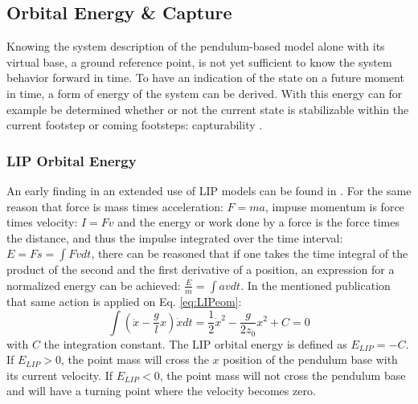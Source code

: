 \subsection{Orbital Energy \& Capture}\label{sec:ewalking}
Knowing the system description of the pendulum-based model alone with its virtual base, a ground reference point, is not yet sufficient to know the system behavior forward in time. To have an indication of the state on a future moment in time, a form of energy of the system can be derived. With this energy can for example be determined whether or not the current state is stabilizable within the current footstep or coming footsteps: capturability \cite{koolen2012capturability}. 

\subsubsection{LIP Orbital Energy}\label{subsec:liporbit}
An early finding in an extended use of \ac{LIP} models can be found in \cite{kajita1992dynamic}. For the same reason that force is mass times acceleration: $F=ma$, impuse momentum is force times velocity: $I=Fv$ and the energy or work done by a force is the force times the distance, and thus the impulse integrated over the time interval: $E = Fs = \int Fv dt$, there can be reasoned that if one takes the time integral of the product of the second and the first derivative of a position, an expression for a normalized energy can be achieved: $\frac{E}{m}=\int av dt$. In the mentioned publication that same action is applied on Eq. \eqref{eq:LIPeom}:
\begin{equation}
\int (\ddot{x}-\frac{g}{l}x)\dot{x} dt = \frac{1}{2}\dot{x}^2-\frac{g}{2z_0}x^2 +C=0
\label{eq:Elip}
\end{equation}
with $C$ the integration constant. The \ac{LIP} orbital energy is defined as $E_{LIP}=-C$. If $E_{LIP}>0$, the point mass will cross the $x$ position of the pendulum base with its current velocity. If $E_{LIP}<0$, the point mass will not cross the pendulum base and will have a turning point where the velocity becomes zero.

